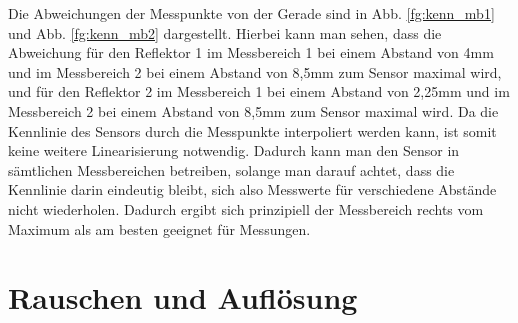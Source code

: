 Die Abweichungen der Messpunkte von der Gerade sind in Abb. \ref{fg:kenn_mb1} und Abb. \ref{fg:kenn_mb2} dargestellt. Hierbei kann man sehen, dass die Abweichung für den Reflektor 1 im Messbereich 1 bei einem Abstand von 4mm und im Messbereich 2 bei einem Abstand von 8,5mm zum Sensor maximal wird, und für den Reflektor 2 im Messbereich 1 bei einem Abstand von 2,25mm und im Messbereich 2 bei einem Abstand von 8,5mm zum Sensor maximal wird. Da die Kennlinie des Sensors durch die Messpunkte interpoliert werden kann, ist somit keine weitere Linearisierung notwendig. Dadurch kann man den Sensor in sämtlichen Messbereichen betreiben, solange man darauf achtet, dass die Kennlinie darin eindeutig bleibt, sich also Messwerte für verschiedene Abstände nicht wiederholen. Dadurch ergibt sich prinzipiell der Messbereich rechts vom Maximum als am besten geeignet für Messungen.

\section{Rauschen und Auflösung}

